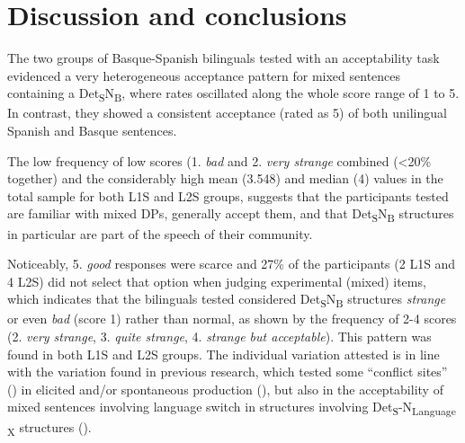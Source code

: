\documentclass[output=paper]{langscibook}
\begin{document}
\section{Discussion and conclusions}\label{sec:ezeiza:5}

The two groups of Basque-Spanish bilinguals tested with an acceptability task evidenced a very heterogeneous acceptance pattern for mixed sentences containing a Det\textsubscript{S}N\textsubscript{B}, where rates oscillated along the whole score range of 1 to 5. In contrast, they showed a consistent acceptance (rated as 5) of both unilingual Spanish and Basque sentences.

The low frequency of low scores (1. \textit{bad} and 2. \textit{very strange} combined (<20\% together) and the considerably high mean (3.548) and median (4) values in the total sample for both L1S and L2S groups, suggests that the participants tested are familiar with mixed DPs, generally accept them, and that Det\textsubscript{S}N\textsubscript{B} structures in particular are part of the speech of their community.

Noticeably, 5. \textit{good} responses were scarce and 27\% of the participants (2 L1S and 4 L2S) did not select that option when judging experimental (mixed) items, which indicates that the bilinguals tested considered Det\textsubscript{S}N\textsubscript{B} structures \textit{strange} or even \textit{bad} (score 1) rather than normal, as shown by the frequency of 2-4 scores (2. \textit{very strange}, 3. \textit{quite strange}, 4.  \textit{strange but acceptable}). This pattern was found in both L1S and L2S groups. The individual variation attested is in line with the variation found in previous research, which tested some “conflict sites” (\citealt{PoplackMeechan1998}) in elicited and/or spontaneous production (\citealt{Cruz2023,DuBord2004,OthegyLapidus2003,PoplackEtAl1982}), but also in the acceptability of mixed sentences involving language switch in structures involving Det\textsubscript{S}{}-N\textsubscript{Language X} structures (\citealt{Beatty-MartínezDussias2019,BellamyParafitaCouto2022,LicerasFernándezFuertes2018,LicerasEtAl2008,ValdésKroffEtAl2017}).
\end{document}
